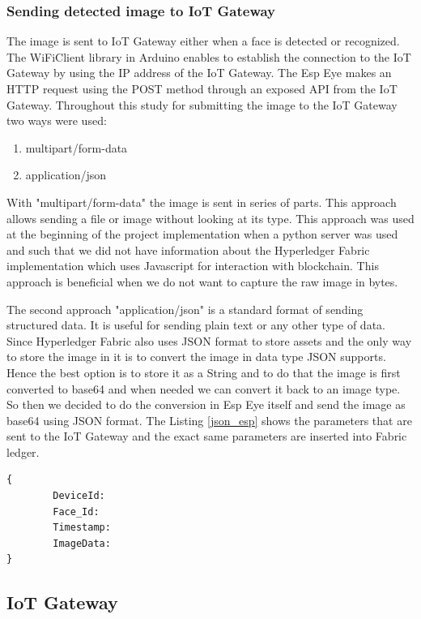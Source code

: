 \subsubsection{Sending detected image to IoT Gateway} 

The image is sent to IoT Gateway either when a face is detected or recognized. The WiFiClient library in Arduino enables to establish the connection to the IoT Gateway by using the IP address of the IoT Gateway. The Esp Eye makes an HTTP request using the POST method through an exposed API from the IoT Gateway. Throughout this study for submitting the image to the IoT Gateway two ways were used: 
\begin{enumerate}
    \item multipart/form-data
    \item application/json
\end{enumerate}

With "multipart/form-data" the image is sent in series of parts. This approach allows sending a file or image without looking at its type. This approach was used at the beginning of the project implementation when a python server was used and such that we did not have information about the Hyperledger Fabric implementation which uses Javascript for interaction with blockchain. This approach is beneficial when we do not want to capture the raw image in bytes. 

The second approach "application/json" is a standard format of sending structured data. It is useful for sending plain text or any other type of data. Since Hyperledger Fabric also uses JSON format to store assets and the only way to store the image in it is to convert the image in data type JSON supports. Hence the best option is to store it as a String and to do that the image is first converted to {\selectfont base64} and when needed we can convert it back to an image type. So then we decided to do the conversion in Esp Eye itself and send the image as {\selectfont base64} using JSON format. 
The Listing \ref{json_esp} shows the parameters that are sent to the IoT Gateway and the exact same parameters are inserted into Fabric ledger.
\begin{lstlisting}[caption={JSON structure in Esp Eye},label=json_esp, captionpos=b]
{
        DeviceId: 
        Face_Id: 
        Timestamp: 
        ImageData: 
}

\end{lstlisting}


\subsection{IoT Gateway}

